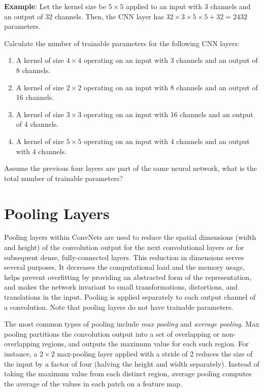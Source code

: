 \textbf{Example}: Let the kernel size be $5 \times 5$ applied to an input with $3$ channels and an output of $32$ channels. Then, the CNN layer has $32 \times 3 \times 5 \times 5 + 32 = 2432$ parameters.


\begin{exercisebox}

Calculate the number of trainable parameters for the following CNN layers:
\begin{enumerate}
\item A kernel of size $4 \times 4$ operating on an input with 3 channels and an output of 8 channels.
\item A kernel of size $2 \times 2$ operating on an input with 8 channels and an output of 16 channels.
\item A kernel of size $3 \times 3$ operating on an input with 16 channels and an output of 4 channels.
\item A kernel of size $5 \times 5$ operating on an input with 4 channels and an output with 4 channels.
\end{enumerate}
Assume the previous four layers are part of the same neural network, what is the total number of trainable parameters?
\end{exercisebox}



\section{Pooling Layers}

Pooling layers within ConvNets are used to reduce the spatial dimensions (width and height) of the convolution output for the next convolutional layers or for subsequent dense, fully-connected layers. This reduction in dimensions serves several purposes. It decreases the computational load and the memory usage, helps prevent overfitting by providing an abstracted form of the representation, and makes the network invariant to small transformations, distortions, and translations in the input. Pooling is applied separately to each output channel of a convolution. Note that pooling layers do not have trainable parameters.

The most common types of pooling include \emph{max pooling} and \emph{average pooling}. Max pooling partitions the convolution output into a set of overlapping or non-overlapping regions, and outputs the maximum value for each such region. For instance, a $2 \times 2$ max-pooling layer applied with a stride of 2 reduces the size of the input by a factor of four (halving the height and width separately). Instead of taking the maximum value from each distinct region, average pooling computes the average of the values in each patch on a feature map. 

